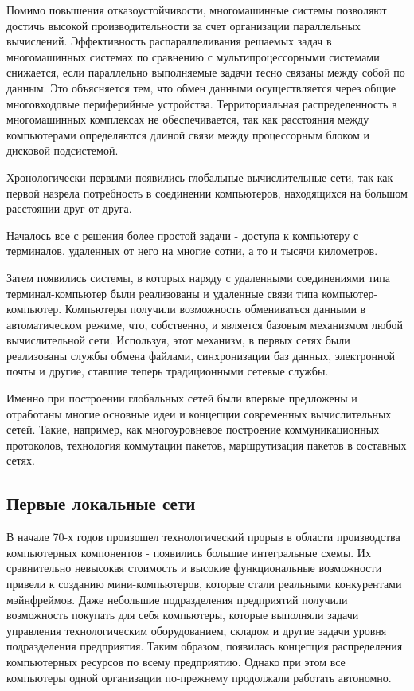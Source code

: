 Помимо повышения отказоустойчивости, многомашинные системы позволяют достичь высокой производительности за счет организации параллельных вычислений.
Эффективность распараллеливания решаемых задач в многомашинных системах по сравнению с мультипроцессорными системами снижается, если параллельно выполняемые задачи тесно связаны между собой по данным.
Это объясняется тем, что обмен данными осуществляется через общие многовходовые периферийные устройства.
Территориальная распределенность в многомашинных комплексах не обеспечивается, так как расстояния между компьютерами определяются длиной связи между процессорным блоком и дисковой подсистемой.

Хронологически первыми появились глобальные вычислительные сети, так как первой назрела потребность в соединении компьютеров, находящихся на большом расстоянии друг от друга.

Началось все с решения более простой задачи - доступа к компьютеру с терминалов, удаленных от него на многие сотни, а то и тысячи километров.

Затем появились системы, в которых наряду с удаленными соединениями типа терминал-компьютер были реализованы и удаленные связи типа компьютер-компьютер.
Компьютеры получили возможность обмениваться данными в автоматическом режиме, что, собственно, и является базовым механизмом любой вычислительной сети.
Используя, этот механизм, в первых сетях были реализованы службы обмена файлами, синхронизации баз данных, электронной почты и другие, ставшие теперь традиционными сетевые службы.

Именно при построении глобальных сетей были впервые предложены и отработаны многие основные идеи и концепции современных вычислительных сетей.
Такие, например, как многоуровневое построение коммуникационных протоколов, технология коммутации пакетов, маршрутизация пакетов в составных сетях.

\subsection{Первые локальные сети}

В начале 70-х годов произошел технологический прорыв в области производства компьютерных компонентов - появились большие интегральные схемы.
Их сравнительно невысокая стоимость и высокие функциональные возможности привели к созданию мини-компьютеров, которые стали реальными конкурентами мэйнфреймов.
Даже небольшие подразделения предприятий получили возможность покупать для себя компьютеры, которые выполняли задачи управления технологическим оборудованием, складом и другие задачи уровня подразделения предприятия.
Таким образом, появилась концепция распределения компьютерных ресурсов по всему предприятию.
Однако при этом все компьютеры одной организации по-прежнему продолжали работать автономно.


